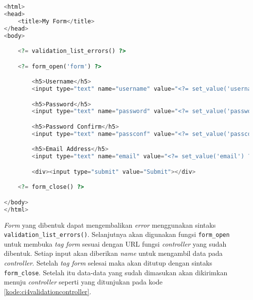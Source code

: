 \begin{lstlisting}[language=PHP, caption=Contoh kode untuk melakukan pengumpulan data. ,label=kode:ci4validationform]
<html>
<head>
    <title>My Form</title>
</head>
<body>

    <?= validation_list_errors() ?>

    <?= form_open('form') ?>

        <h5>Username</h5>
        <input type="text" name="username" value="<?= set_value('username') ?>" size="50">

        <h5>Password</h5>
        <input type="text" name="password" value="<?= set_value('password') ?>" size="50">

        <h5>Password Confirm</h5>
        <input type="text" name="passconf" value="<?= set_value('passconf') ?>" size="50">

        <h5>Email Address</h5>
        <input type="text" name="email" value="<?= set_value('email') ?>" size="50">

        <div><input type="submit" value="Submit"></div>

    <?= form_close() ?>

</body>
</html>
\end{lstlisting}

\textit{Form} yang dibentuk dapat mengembalikan \textit{error} menggunakan sintaks \texttt{validation\_list\_errors()}. Selanjutnya akan digunakan fungsi \texttt{form\_open} untuk membuka \textit{tag form} sesuai dengan URL fungsi \textit{controller} yang sudah dibentuk. Setiap input akan diberikan \textit{name} untuk mengambil data pada \textit{controller}. Setelah \textit{tag form} selesai maka akan ditutup dengan sintaks \texttt{form\_close}. Setelah itu data-data yang sudah dimasukan akan dikirimkan menuju \textit{controller} seperti yang ditunjukan pada kode \ref{kode:ci4validationcontroller}.

